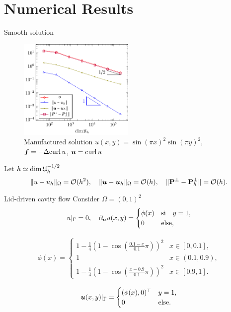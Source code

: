 \documentclass[10pt]{beamer}
\begin{document}
\section{Numerical Results}
\begin{frame}{Smooth solution}
    \begin{figure}
        \centering
        \includegraphics[width=15em]{plots_stokes.pdf}
        \caption{Manufactured solution $u(x,y)=\sin(\pi x)^2 \sin(\pi y)^2$, $\boldsymbol{f} = -\Delta {\rm curl\,} u$, $\boldsymbol{u}={\rm curl\,} u$ }
        \label{fig:enter-label}
    \end{figure}
Let $h \simeq \dim \mathfrak{U}_h^{-1/2}$
\begin{align*}
    \|u-u_h\|_\Omega = \mathcal{O}(h^2), \quad \|\boldsymbol{u}-\boldsymbol{u}_h\|_\Omega = \mathcal{O}(h), \quad \|\mathbf{P}^\perp-\mathbf{P}_h^\perp\| = \mathcal{O}(h).
\end{align*}
\end{frame}
\begin{frame}{Lid-driven cavity flow}
Consider $\Omega =(0,1)^2$
    \begin{align*}
  u|_\Gamma = 0, \quad \partial_{\boldsymbol{n}}u(x,y) = 
  \begin{cases}
    \phi(x) & \text{si} \quad  y=1, \\
    0 & \text{else},
  \end{cases}
\end{align*}

\begin{align*}
  \phi(x) = \begin{cases}
    1-\tfrac14\left(1-\cos(\tfrac{0.1-x}{0.1}\pi)\right)^2 & x\in[0,0.1], \\
    1 & x\in(0.1,0.9), \\
    1-\tfrac14\left(1-\cos(\tfrac{x-0.9}{0.1}\pi)\right)^2& x\in[0.9,1].
  \end{cases}
\end{align*}

\begin{align*}
  \boldsymbol{u}(x,y)|_\Gamma = \begin{cases}
    (\phi(x),0)^\top & y=1, \\
    0 & \text{else}.
  \end{cases}
\end{align*}
\end{frame}
\end{document}

